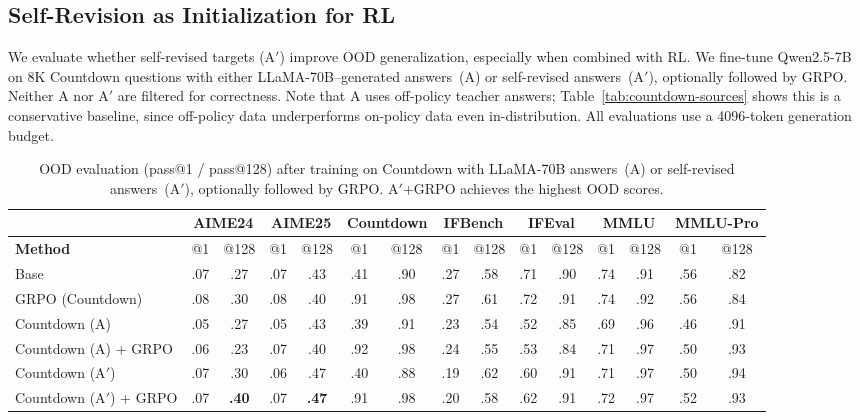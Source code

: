 \subsection{Self-Revision as Initialization for RL}

\label{app:countdown-ood}
 
We evaluate whether self-revised targets (A$'$) improve OOD
generalization, especially when combined with RL.  We fine-tune
Qwen2.5-7B on 8K Countdown questions with either LLaMA-70B--generated
answers~(A) or self-revised answers~(A$'$), optionally followed by GRPO.
Neither A nor A$'$ are filtered for correctness.  Note that A uses
off-policy teacher answers; Table~\ref{tab:countdown-sources} shows this
is a conservative baseline, since off-policy data underperforms
on-policy data even in-distribution.  All evaluations use a 4096-token
generation budget.
 
\begin{table}[h]
\centering
\vspace{4pt}
\footnotesize
\setlength{\tabcolsep}{1.5pt}
\begin{tabular}{l cc cc cc cc cc cc cc}
\toprule
& \multicolumn{2}{c}{\textbf{AIME24}}
& \multicolumn{2}{c}{\textbf{AIME25}}
& \multicolumn{2}{c}{\textbf{Countdown}}
& \multicolumn{2}{c}{\textbf{IFBench}}
& \multicolumn{2}{c}{\textbf{IFEval}}
& \multicolumn{2}{c}{\textbf{MMLU}}
& \multicolumn{2}{c}{\textbf{MMLU-Pro}} \\
\midrule
\textbf{Method}
& @1 & @128 & @1 & @128 & @1 & @128
& @1 & @128 & @1 & @128 & @1 & @128 & @1 & @128 \\
\midrule
Base
  & .07 & .27 & .07 & .43 & .41 & .90
  & .27 & .58 & .71 & .90 & .74 & .91
  & .56 & .82 \\
GRPO (Countdown)
  & .08 & .30 & .08 & .40 & .91 & .98
  & .27 & .61 & .72 & .91 & .74 & .92
  & .56 & .84 \\
\midrule
Countdown (A)
  & .05 & .27 & .05 & .43 & .39 & .91
  & .23 & .54 & .52 & .85 & .69 & .96
  & .46 & .91 \\
Countdown (A) + GRPO
  & .06 & .23 & .07 & .40 & .92 & .98
  & .24 & .55 & .53 & .84 & .71 & .97
  & .50 & .93 \\
\midrule
Countdown (A$'$)
  & .07 & .30 & .06 & .47 & .40 & .88
  & .19 & .62 & .60 & .91 & .71 & .97
  & .50 & .94 \\
Countdown (A$'$) + GRPO
  & .07 & \textbf{.40} & .07 & \textbf{.47} & .91 & .98
  & .20 & .58 & .62 & .91 & .72 & .97
  & .52 & .93 \\
\bottomrule
\end{tabular}
\caption{%
  OOD evaluation (pass@1 / pass@128) after training on Countdown with
  LLaMA-70B answers~(A) or self-revised answers~(A$'$), optionally
  followed by GRPO.  A$'$+GRPO achieves the highest OOD scores.}
\label{tab:countdown-ood}
\end{table}

